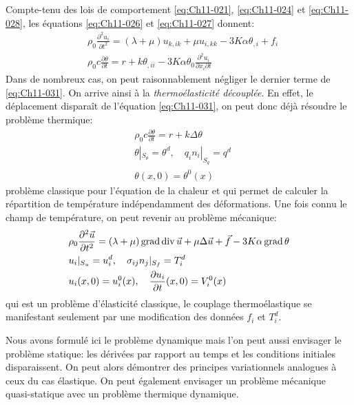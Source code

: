 Compte-tenu des lois de comportement \eqref{eq:Ch11-021}, \eqref{eq:Ch11-024} et \eqref{eq:Ch11-028}, les équations \eqref{eq:Ch11-026} et \eqref{eq:Ch11-027} donnent: 
\begin{subequations}
\begin{align}
    &\rho_0 \frac{\partial^2 u_i}{\partial t^2} = (\lambda +\mu) u_{k,ik} + \mu u_{i,kk} - 3 K \alpha \theta_{,i} +f_i
    \label{eq:Ch11-030}\\
    &\rho_0 c \frac{\partial \theta}{\partial t} = r + k\theta_{,ii} - 3 K \alpha \theta_0 \frac{\partial^2 u_i}{\partial x_i \partial t}
    \label{eq:Ch11-031}
\end{align}
\end{subequations}
Dans de nombreux cas, on peut raisonnablement négliger le dernier terme de \eqref{eq:Ch11-031}.
On arrive ainsi à la \emph{thermoélasticité découplée}.
En effet, le déplacement disparaît de l'équation \eqref{eq:Ch11-031}, on peut donc déjà résoudre le problème thermique:
\begin{equation}
  \begin{aligned}
    &\rho_0 c \frac{\partial \theta}{\partial t} = r + k\Delta \theta \\
    &\theta|_{S_\theta} = \theta^d,\quad  q_in_i|_{S_q} = q^d \\
    &\theta (x,0) = \theta^0(x)
  \end{aligned}
    \label{eq:Ch11-032}
\end{equation}
problème classique pour l'équation de la chaleur et qui permet de calculer la répartition de température indépendamment des déformations.
Une fois connu le champ de température, on peut revenir au problème mécanique: 
\begin{equation}
  \begin{aligned}
    &\rho_0 \frac{\partial^2 \vec{u}}{\partial t^2} = (\lambda + \mu) \operatorname*{\mathrm{grad}} \operatorname*{\mathrm{div}} \vec{u} + \mu \Delta \vec{u} +\vec{f} - 3 K \alpha \operatorname*{\mathrm{grad}} \theta \\
    &u_i|_{S_u} = u_i^d,\quad  \sigma_{ij}n_j|_{S_f} = T_i^d \\
    &u_i(x,0)= u_i^0(x),\quad  \frac{\partial u_i}{\partial t}(x,0) = V_i^0(x)
  \end{aligned}
    \label{eq:Ch11-033}
\end{equation}
qui est un problème d'élasticité classique, le couplage thermoélastique se 
manifestant seulement par une modification des données $f_i$ et $T_i^d$. 

Nous avons formulé ici le problème dynamique mais l'on peut aussi envisager le problème statique: les dérivées par rapport au temps et les conditions initiales disparaissent.
On peut alors démontrer des principes variationnels analogues à ceux du cas élastique.
On peut également envisager un problème mécanique quasi-statique avec un problème thermique dynamique. 

